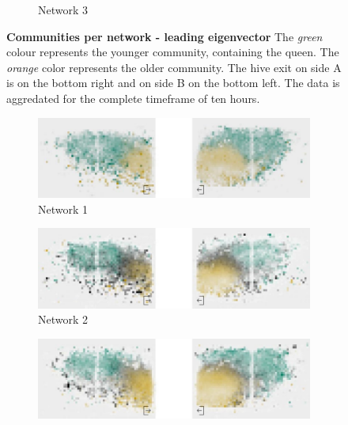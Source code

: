 \begin{figure}[htb]
\begin{subfigure}[b]{1.0\textwidth}
		\caption[Network 3]{Network 3}
		\label{fig:le3}
		\vspace*{5mm}
	\end{subfigure}
	\caption[Communities per network - leading eigenvector]{\textbf{Communities per network - leading eigenvector} The \emph{green} colour represents the younger community, containing the queen. The \emph{orange} color represents the older community. The hive exit on side A is on the bottom right and on side B on the bottom left. The data is aggredated for the complete timeframe of ten hours.}
	\label{fig:communitiesPerNetworkLE}
\end{figure}

\begin{figure}[htb]
	\centering
	\begin{subfigure}[b]{1.0\textwidth}
		\centering
		\includegraphics[width=\textwidth]{Figures/wt_network1}
		\caption[Network 1]{Network 1}
		\label{fig:wt1}
		\vspace*{5mm}
	\end{subfigure}
	\begin{subfigure}[b]{1.0\textwidth}
		\includegraphics[width=\textwidth]{Figures/wt_network2}
		\caption[Network 2]{Network 2}
		\label{fig:wt2}
		\vspace*{5mm}
	\end{subfigure}
	\begin{subfigure}[b]{1.0\textwidth}
		\includegraphics[width=\textwidth]{Figures/wt_network3}

\end{subfigure}
\end{figure}
